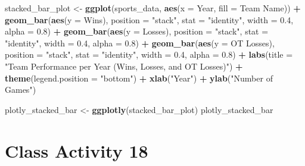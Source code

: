 \documentclass[
]{book}
\newenvironment{Shaded}{\begin{snugshade}}{\end{snugshade}}
\newcommand{\AttributeTok}[1]{\textcolor[rgb]{0.13,0.29,0.53}{#1}}
\newcommand{\FloatTok}[1]{\textcolor[rgb]{0.00,0.00,0.81}{#1}}
\newcommand{\FunctionTok}[1]{\textcolor[rgb]{0.13,0.29,0.53}{\textbf{#1}}}
\newcommand{\NormalTok}[1]{#1}
\newcommand{\OtherTok}[1]{\textcolor[rgb]{0.56,0.35,0.01}{#1}}
\newcommand{\SpecialCharTok}[1]{\textcolor[rgb]{0.81,0.36,0.00}{\textbf{#1}}}
\newcommand{\StringTok}[1]{\textcolor[rgb]{0.31,0.60,0.02}{#1}}
\begin{document}
\begin{Shaded}
\begin{Highlighting}[]
\NormalTok{stacked\_bar\_plot }\OtherTok{\textless{}{-}} \FunctionTok{ggplot}\NormalTok{(sports\_data, }\FunctionTok{aes}\NormalTok{(}\AttributeTok{x =}\NormalTok{ Year, }\AttributeTok{fill =} \StringTok{\textasciigrave{}}\AttributeTok{Team Name}\StringTok{\textasciigrave{}}\NormalTok{)) }\SpecialCharTok{+}
  \FunctionTok{geom\_bar}\NormalTok{(}\FunctionTok{aes}\NormalTok{(}\AttributeTok{y =}\NormalTok{ Wins), }\AttributeTok{position =} \StringTok{"stack"}\NormalTok{, }\AttributeTok{stat =} \StringTok{"identity"}\NormalTok{, }\AttributeTok{width =} \FloatTok{0.4}\NormalTok{, }\AttributeTok{alpha =} \FloatTok{0.8}\NormalTok{) }\SpecialCharTok{+}
  \FunctionTok{geom\_bar}\NormalTok{(}\FunctionTok{aes}\NormalTok{(}\AttributeTok{y =}\NormalTok{ Losses), }\AttributeTok{position =} \StringTok{"stack"}\NormalTok{, }\AttributeTok{stat =} \StringTok{"identity"}\NormalTok{, }\AttributeTok{width =} \FloatTok{0.4}\NormalTok{, }\AttributeTok{alpha =} \FloatTok{0.8}\NormalTok{) }\SpecialCharTok{+}
  \FunctionTok{geom\_bar}\NormalTok{(}\FunctionTok{aes}\NormalTok{(}\AttributeTok{y =} \StringTok{\textasciigrave{}}\AttributeTok{OT Losses}\StringTok{\textasciigrave{}}\NormalTok{), }\AttributeTok{position =} \StringTok{"stack"}\NormalTok{, }\AttributeTok{stat =} \StringTok{"identity"}\NormalTok{, }\AttributeTok{width =} \FloatTok{0.4}\NormalTok{, }\AttributeTok{alpha =} \FloatTok{0.8}\NormalTok{) }\SpecialCharTok{+}
  \FunctionTok{labs}\NormalTok{(}\AttributeTok{title =} \StringTok{"Team Performance per Year (Wins, Losses, and OT Losses)"}\NormalTok{) }\SpecialCharTok{+}
  \FunctionTok{theme}\NormalTok{(}\AttributeTok{legend.position =} \StringTok{"bottom"}\NormalTok{) }\SpecialCharTok{+}
  \FunctionTok{xlab}\NormalTok{(}\StringTok{"Year"}\NormalTok{) }\SpecialCharTok{+}
  \FunctionTok{ylab}\NormalTok{(}\StringTok{"Number of Games"}\NormalTok{)}

\NormalTok{plotly\_stacked\_bar }\OtherTok{\textless{}{-}} \FunctionTok{ggplotly}\NormalTok{(stacked\_bar\_plot)}
\NormalTok{plotly\_stacked\_bar}
\end{Highlighting}
\end{Shaded}

\hypertarget{class-activity-18}{%
\chapter{Class Activity 18}\label{class-activity-18}}
\end{document}
